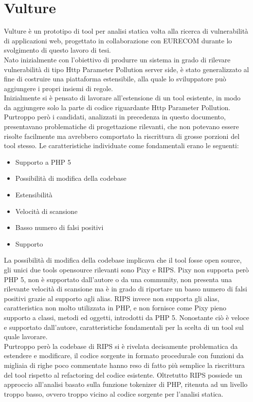 \chapter{Vulture}
Vulture è un prototipo di tool per analisi statica volta alla ricerca di vulnerabilità di applicazioni web, progettato in collaborazione con EURECOM durante lo svolgimento di questo lavoro di tesi.\\
Nato inizialmente con l'obiettivo di produrre un sistema in grado di rilevare vulnerabilità di tipo Http Parameter Pollution server side, è stato generalizzato al fine di costruire una piattaforma estensibile, alla quale lo sviluppatore può aggiungere i propri insiemi di regole.\\
Inizialmente si è pensato di lavorare all'estensione di un tool esistente, in modo da aggiungere solo la parte di codice riguardante Http Parameter Pollution. Purtroppo però i candidati, analizzati in precedenza in questo documento, presentavano problematiche di progettazione rilevanti, che non potevano essere risolte facilmente ma avrebbero comportato la riscrittura di grosse porzioni del tool stesso. 
Le caratteristiche individuate come fondamentali erano le seguenti:
\begin{itemize}
\item Supporto a PHP 5
\item Possibilità di modifica della codebase
\item Estensibilità
\item Velocità di scansione
\item Basso numero di falsi positivi
\item Supporto
\end{itemize}
La possibilità di modifica della codebase implicava che il tool fosse open source, gli unici due tools opensource rilevanti sono Pixy e RIPS.
Pixy non supporta però PHP 5, non è supportato dall'autore o da una community, non presenta una rilevante velocità di scansione ma è in grado di riportare un basso numero di falsi positivi grazie al supporto agli alias.
RIPS invece non supporta gli alias, caratteristica non molto utilizzata in PHP, e non fornisce come Pixy pieno supporto a classi, metodi ed oggetti, introdotti da PHP 5. Nonostante ciò è veloce e supportato dall'autore, caratteristiche fondamentali per la scelta di un tool sul quale lavorare.\\
Purtroppo però la codebase di RIPS si è rivelata decisamente problematica da estendere e modificare, il codice sorgente in formato procedurale con funzioni da migliaia di righe poco commentate hanno reso di fatto più semplice la riscrittura del tool rispetto al refactoring del codice esistente. Oltretutto RIPS possiede un approccio all'analisi basato sulla funzione tokenizer di PHP, ritenuta ad un livello troppo basso, ovvero troppo vicino al codice sorgente per l'analisi statica.


